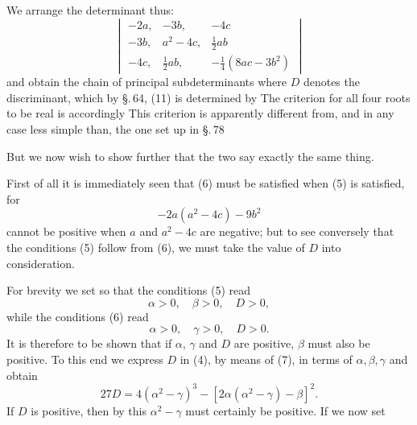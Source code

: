We arrange the determinant thus:
\[
\begin{vmatrix}
-2a, & -3b, & -4c \\
-3b, & a^2 - 4c, & \tfrac{1}{2} a b \\
-4c, & \tfrac{1}{2} a b, & -\tfrac{1}{4} (8ac - 3b^2)
\end{vmatrix}
\]
and obtain the chain of principal subdeterminants
where $D$ denotes the discriminant, which by \S.\,64, (11) is determined by
The criterion for all four roots to be real is accordingly
This criterion is apparently different from, and in any case less simple than, the one set up in \S.\,78

But we now wish to show further that the two say exactly the same thing.

First of all it is immediately seen that (6) must be satisfied when (5) is satisfied, for
\[
- 2a(a^2 - 4c) - 9b^2
\]
cannot be positive when $a$ and $a^2 - 4c$ are negative; but to see conversely that the conditions (5) follow from (6), we must take the value of $D$ into consideration.

For brevity we set
so that the conditions (5) read
\[
\alpha > 0, \quad \beta > 0, \quad D > 0,
\]
while the conditions (6) read
\[
\alpha > 0, \quad \gamma > 0, \quad D > 0\text{.}
\]
It is therefore to be shown that if $\alpha$, $\gamma$ and $D$ are positive, $\beta$ must also be positive. To this end we express $D$ in (4), by means of (7), in terms of $\alpha, \beta, \gamma$ and obtain
\[
27 D = 4(\alpha^2 - \gamma)^3 - [2\alpha(\alpha^2 - \gamma) - \beta]^2.
\]
If $D$ is positive, then by this $\alpha^2 - \gamma$ must certainly be positive. If we now set
